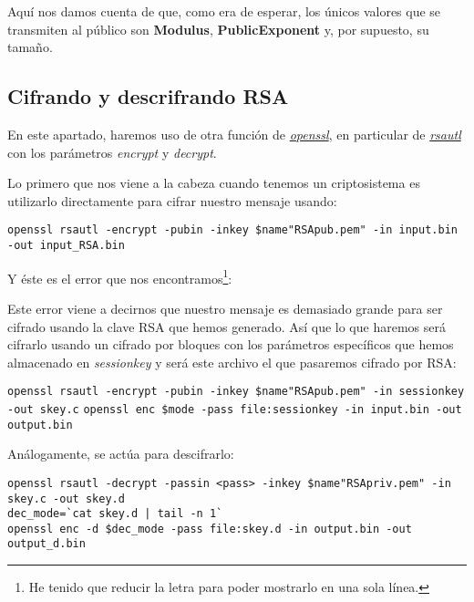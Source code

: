 \documentclass[a4paper, 11pt]{article}
\begin{document}
		Aquí nos damos cuenta de que, como era de esperar, los únicos valores que se transmiten al público son \textbf{Modulus},
		\textbf{PublicExponent} y, por supuesto, su tamaño.
		
	\subsection{Cifrando y descrifrando RSA}
		En este apartado, haremos uso de otra función de \href{http://manpages.ubuntu.com/manpages/zesty/en/man1/openssl.1ssl.html}
		{\textit{openssl}}, en particular de \href{https://www.openssl.org/docs/man1.0.2/apps/rsautl.html}{\textit{rsautl}} con
		los parámetros \textit{encrypt} y \textit{decrypt}.
	
		Lo primero que nos viene a la cabeza cuando tenemos un criptosistema es utilizarlo directamente para cifrar nuestro
		mensaje usando: \\
		\begin{small}
			\verb|openssl rsautl -encrypt -pubin -inkey $name"RSApub.pem" -in input.bin -out input_RSA.bin|
		\end{small}	
		
		Y éste es el error que nos encontramos\footnote{He tenido que reducir la letra para poder mostrarlo en una sola línea.}:
		
		
		Este error viene a decirnos que nuestro mensaje es demasiado grande para ser cifrado usando la clave RSA que hemos
		generado. Así que lo que haremos será cifrarlo usando un cifrado por bloques con los parámetros específicos que hemos
		almacenado en \textit{sessionkey} y será este archivo el que pasaremos cifrado por RSA:
		
		\begin{small}
			\verb|openssl rsautl -encrypt -pubin -inkey $name"RSApub.pem" -in sessionkey -out skey.c|
			\verb|openssl enc $mode -pass file:sessionkey -in input.bin -out output.bin|
		\end{small}
		
		Análogamente, se actúa para descifrarlo:
		
		\begin{small}
			\verb|openssl rsautl -decrypt -passin <pass> -inkey $name"RSApriv.pem" -in skey.c -out skey.d| \\
			\verb!dec_mode=`cat skey.d | tail -n 1`! \\
			\verb|openssl enc -d $dec_mode -pass file:skey.d -in output.bin -out output_d.bin|
		\end{small}
		
\end{document}
